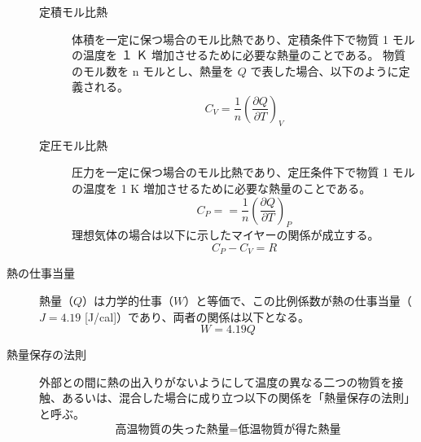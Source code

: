\documentclass[uplatex,dvipdfmx,a4paper,11pt]{jsarticle}
\begin{document}
\begin{description}
\begin{description}
\item[定積モル比熱]
体積を一定に保つ場合のモル比熱であり、定積条件下で物質 1 モルの温度を １ Ｋ 増加させるために必要な熱量のことである。
物質のモル数を n モルとし、熱量を $Q$ で表した場合、以下のように定義される。
\begin{equation*}
C_V = \dfrac{1}{n} \left( \dfrac{\partial Q}{\partial T} \right)_V
\end{equation*}

\item[定圧モル比熱]
圧力を一定に保つ場合のモル比熱であり、定圧条件下で物質 1 モルの温度を 1 K 増加させるために必要な熱量のことである。
\begin{equation*}
C_P = = \dfrac{1}{n} \left( \dfrac{\partial Q}{\partial T} \right)_P
\end{equation*}
理想気体の場合は以下に示したマイヤーの関係が成立する。
\begin{equation*}
C_P - C_V = R
\end{equation*}


\end{description}


\item[熱の仕事当量]
熱量（$Q$）は力学的仕事（$W$）と等価で、この比例係数が熱の仕事当量（$J=4.19$ [J/cal]）であり、両者の関係は以下となる。
\begin{equation*}
W=4.19 Q
\end{equation*}

\item[熱量保存の法則]

外部との間に熱の出入りがないようにして温度の異なる二つの物質を接触、あるいは、混合した場合に成り立つ以下の関係を「熱量保存の法則」と呼ぶ。
\begin{equation*}
\text{高温物質の失った熱量} = \text{低温物質が得た熱量}
\end{equation*}

\end{description}
\end{document}
